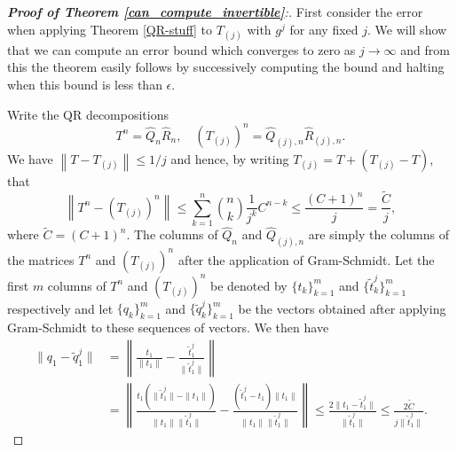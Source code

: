 \documentclass[a4paper,10pt]{article}
\begin{document}
\begin{proof}[\textbf{Proof of Theorem \ref{can_compute_invertible}}:]
First consider the error when applying Theorem \ref{QR-stuff} to $T_{(j)}$ with $g^j$ for any fixed $j$. We will show that we can compute an error bound which converges to zero as $j\rightarrow\infty$ and from this the theorem easily follows by successively computing the bound and halting when this bound is less than $\epsilon$.

Write the QR decompositions
$$
T^n=\hat Q_n \hat R_n,\quad  (T_{(j)})^n=\hat{Q}_{(j),n}\hat{R}_{(j),n}.
$$
We have $\left\|T-T_{(j)}\right\|\leq1/j$ and hence, by writing $T_{(j)}=T+(T_{(j)}-T)$, that
$$
\left\|T^n-(T_{(j)})^n\right\|\leq \sum_{k=1}^n {n \choose k}\frac{1}{j^k}C^{n-k}\leq \frac{(C+1)^n}{j}=\frac{\tilde C}{j},
$$
where $\tilde C=(C+1)^n$. The columns of $\hat Q_n$ and $\hat{Q}_{(j),n}$ are simply the columns of the matrices $T^n$ and $(T_{(j)})^n$ after the application of Gram-Schmidt. Let the first $m$ columns of $T^n$ and $(T_{(j)})^n$ be denoted by $\{t_k\}_{k=1}^m$ and $\{\tilde t_k^j\}_{k=1}^m$ respectively and let $\{q_k\}_{k=1}^m$ and $\{\tilde q_k^j\}_{k=1}^m$ be the vectors obtained after applying Gram-Schmidt to these sequences of vectors. We then have
\begin{equation}
\label{othog_rel_q}
\begin{split}
\|q_1-\tilde q_1^j\|&=\left\|\frac{t_1}{\|t_1\|}-\frac{\tilde t_1^j}{\|\tilde t_1^j\|}\right\|\\
&=\left\|\frac{t_1(\|\tilde t_1^j\|-\|t_1\|)}{\|t_1\|\|\tilde t_1^j\|}-\frac{(\tilde t_1^j-t_1)\|t_1\|}{\|t_1\|\|\tilde t_1^j\|}\right\|\leq \frac{2\|t_1-\tilde t_1^j\|}{\|\tilde t_1^j\|}\leq\frac{2\tilde C}{j\|\tilde t_1^j\|}.
\end{split}
\end{equation}


\end{proof}
\end{document}
